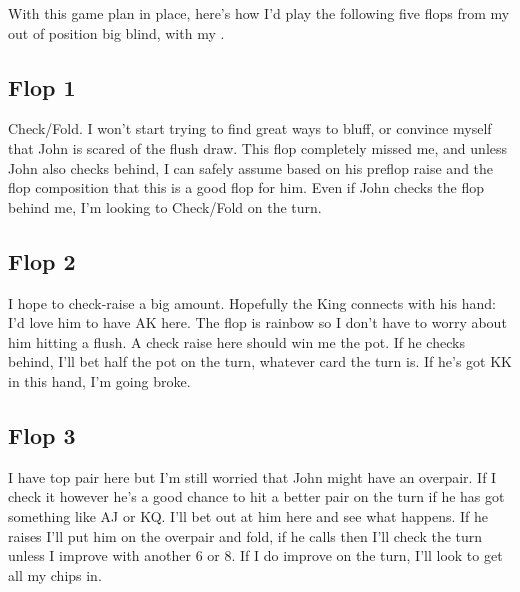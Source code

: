 With this game plan in place, here's how I'd play the following
five flops from my out of position big blind, with my \eigc\sixc.

\subsection*{Flop 1}

\begin{cards}
\crdAh\crdKc\crdtenh%
\end{cards}

Check/Fold. I won't start trying to find great ways to bluff,
or convince myself that John is scared of the flush
draw. This flop completely missed me, and unless John also
checks behind, I can safely assume based on his preflop raise
and the flop composition that this is a good flop for him.
Even if John checks the flop behind me, I'm looking
to Check/Fold on the turn.

\newpage

\subsection*{Flop 2}

\begin{cards}
\crdKs\crdeigh\crdsixd%
\end{cards}

I hope to check-raise a big amount. Hopefully the King connects
with his hand: I'd love him to have AK here. The flop is rainbow
so I don't have to worry about him hitting a flush. A check raise
here should win me the pot. If he checks behind, I'll bet half
the pot on the turn, whatever card the turn is. If he's got KK
in this hand, I'm going broke.

\subsection*{Flop 3}

\begin{cards}
\crdsixd\crdtwos\crdtwoc%
\end{cards}

I have top pair here but I'm still worried that John might have
an overpair. If I check it however he's a good chance to hit
a better pair on the turn if he has got something like AJ or KQ.
I'll bet out at him here and see what happens. If he raises I'll
put him on the overpair and fold, if he calls then I'll check the
turn unless I improve with another 6 or 8. If I do improve on the turn,
I'll look to get all my chips in.

